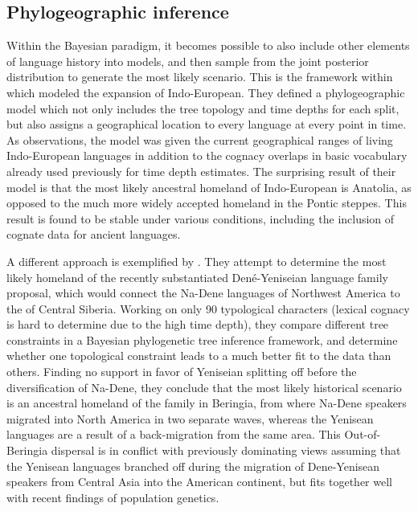 \subsection{Phylogeographic inference}
Within the Bayesian paradigm, it becomes possible to also include other elements of language history into models, and then sample from the joint posterior distribution to generate the most likely scenario. This is the framework within which \citet{bouckaert_ea_2012} modeled the expansion of Indo-European. They defined a phylogeographic model which not only includes the tree topology and time depths for each split, but also assigns a geographical location to every language at every point in time. As observations, the model was given the current geographical ranges of living Indo-European languages in addition to the cognacy overlaps in basic vocabulary already used previously for time depth estimates. The surprising result of their model is that the most likely ancestral homeland of Indo-European is Anatolia, as opposed to the much more widely accepted homeland in the Pontic steppes. This result is found to be stable under various conditions, including the inclusion of cognate data 
for ancient languages.

A different approach is exemplified by \citet{sicoli_holton_2014}. They attempt to determine the most likely homeland of the recently substantiated Den\'{e}-Yeniseian language family proposal, which would connect the Na-Dene languages of Northwest America to the   of Central Siberia. Working on only 90 typological characters (lexical cognacy is hard to determine due to the high time depth), they compare different tree constraints in a Bayesian phylogenetic tree inference framework, and determine whether one topological constraint leads to a much better fit to the data than others. Finding no support in favor of Yeniseian splitting off before the diversification of Na-Dene, they conclude that the most likely historical scenario is an ancestral homeland of the family in Beringia, from where Na-Dene speakers migrated into North America in two separate waves, whereas the Yenisean languages are a result of a back-migration from the same area. This Out-of-Beringia dispersal is in conflict with previously dominating views assuming that the Yenisean languages branched off during the migration of Dene-Yenisean speakers from Central Asia into the American continent, but fits together well with recent findings of population genetics.

